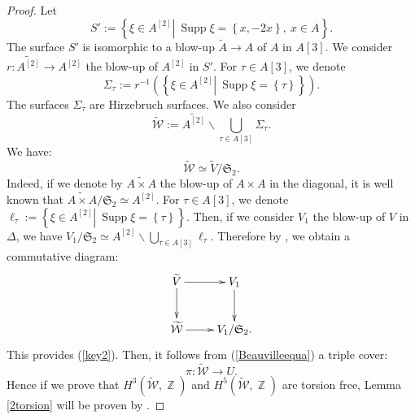 \documentclass[a4paper]{article}
\theoremstyle{remark}
\DeclareMathOperator{\Z}{\mathbb{Z}}
\DeclareMathOperator{\Supp}{Supp}
\begin{document}
\begin{proof}
Let $$S':=\left\{\left.\xi\in A^{[2]}\right|\ \Supp \xi=\left\{x,-2x\right\},\ x\in A\right\}.$$
The surface $S'$ is isomorphic to a blow-up $\widetilde{A} \rightarrow A $ of $A$ in $A[3]$.
We consider $r:\widetilde{A^{[2]}}\rightarrow A^{[2]}$ the blow-up of $A^{[2]}$ in $S'$.
For $\tau\in A[3]$, we denote $$\Sigma_\tau:=r^{-1}\left(\left\{\left.\xi\in A^{[2]}\right|\ \Supp \xi=\left\{\tau\right\}\right\}\right).$$
The surfaces $\Sigma_\tau$ are Hirzebruch surfaces.
We also consider 
$$\widetilde{\mathcal{W}}:=\widetilde{A^{[2]}}\smallsetminus \bigcup_{\tau\in A[3]}\Sigma_\tau.$$
We have:
\begin{equation}
\widetilde{\mathcal{W}}\simeq \widetilde{V}/\mathfrak{S}_2.
\label{key2}
\end{equation}
Indeed, if we denote by $\widetilde{A\times A}$ the blow-up of $A\times A$ in the diagonal, it is well known that $\widetilde{A\times A}/\mathfrak{S}_2\simeq A^{[2]}$. 
For $\tau\in A[3]$, we denote $\ell_\tau:=\left\{\left.\xi\in A^{[2]}\right|\ \Supp \xi=\left\{\tau\right\}\right\}$.
Then, if we consider $V_1$ the blow-up of $V$ in $\Delta$, we have $V_1/\mathfrak{S}_2\simeq A^{[2]}\smallsetminus \bigcup_{\tau\in A[3]} \ell_\tau$.  
Therefore
by \cite[Corollary II 7.15]{Hartshorne}, we obtain a commutative diagram:
$$\xymatrix{\widetilde{V}\ar[r]\ar[d]&V_1\ar[d]\\
\widetilde{\mathcal{W}}\ar[r]&V_1/\mathfrak{S}_2.
}$$
This provides (\ref{key2}).
Then, it follows from (\ref{Beauvilleequa}) a triple cover:
$$\pi:\widetilde{\mathcal{W}}\rightarrow U.$$
Hence if we prove that $H^3(\widetilde{\mathcal{W}},\Z)$ and $H^5(\widetilde{\mathcal{W}},\Z)$ are torsion free, Lemma \ref{2torsion} will be proven by \cite[Theorem 5.4 ]{Transfers}.


\end{proof}
\end{document}
